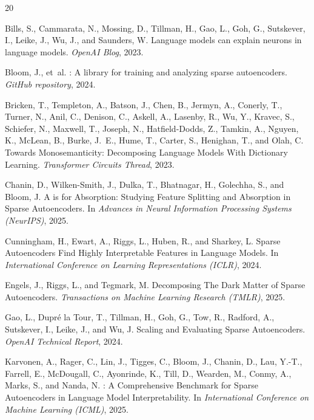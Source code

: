 \documentclass{article}
\begin{document}
\begin{thebibliography}{20}

Bills, S., Cammarata, N., Mossing, D., Tillman, H., Gao, L., Goh, G., Sutskever, I., Leike, J., Wu, J., and Saunders, W.
\newblock Language models can explain neurons in language models.
\newblock \emph{OpenAI Blog}, 2023.

Bloom, J., et~al.
: A library for training and analyzing sparse autoencoders.
\newblock \emph{GitHub repository}, 2024.

Bricken, T., Templeton, A., Batson, J., Chen, B., Jermyn, A., Conerly, T., Turner, N., Anil, C., Denison, C., Askell, A., Lasenby, R., Wu, Y., Kravec, S., Schiefer, N., Maxwell, T., Joseph, N., Hatfield-Dodds, Z., Tamkin, A., Nguyen, K., McLean, B., Burke, J.~E., Hume, T., Carter, S., Henighan, T., and Olah, C.
\newblock Towards Monosemanticity: Decomposing Language Models With Dictionary Learning.
\newblock \emph{Transformer Circuits Thread}, 2023.

Chanin, D., Wilken-Smith, J., Dulka, T., Bhatnagar, H., Golechha, S., and Bloom, J.
\newblock A is for Absorption: Studying Feature Splitting and Absorption in Sparse Autoencoders.
\newblock In \emph{Advances in Neural Information Processing Systems (NeurIPS)}, 2025.

Cunningham, H., Ewart, A., Riggs, L., Huben, R., and Sharkey, L.
\newblock Sparse Autoencoders Find Highly Interpretable Features in Language Models.
\newblock In \emph{International Conference on Learning Representations (ICLR)}, 2024.

Engels, J., Riggs, L., and Tegmark, M.
\newblock Decomposing The Dark Matter of Sparse Autoencoders.
\newblock \emph{Transactions on Machine Learning Research (TMLR)}, 2025.

Gao, L., Dupr\'{e} la Tour, T., Tillman, H., Goh, G., Tow, R., Radford, A., Sutskever, I., Leike, J., and Wu, J.
\newblock Scaling and Evaluating Sparse Autoencoders.
\newblock \emph{OpenAI Technical Report}, 2024.

Karvonen, A., Rager, C., Lin, J., Tigges, C., Bloom, J., Chanin, D., Lau, Y.-T., Farrell, E., McDougall, C., Ayonrinde, K., Till, D., Wearden, M., Conmy, A., Marks, S., and Nanda, N.
: A Comprehensive Benchmark for Sparse Autoencoders in Language Model Interpretability.
\newblock In \emph{International Conference on Machine Learning (ICML)}, 2025.


\end{thebibliography}
\end{document}
